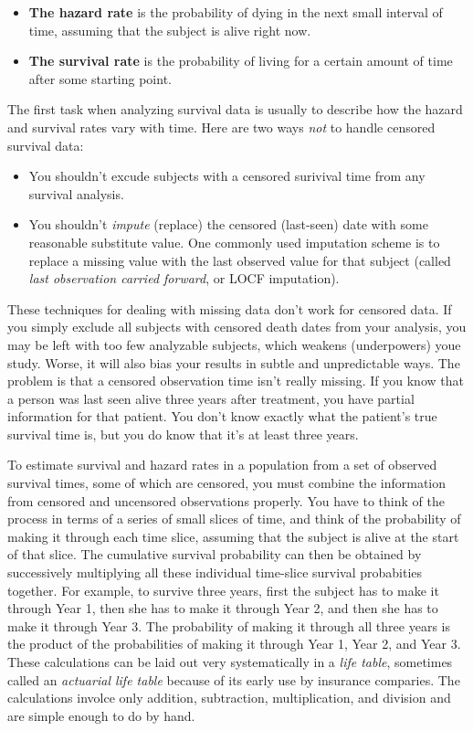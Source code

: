 \documentclass[a4paper,11pt]{article}
\begin{document}
\begin{itemize}[noitemsep]
\item \textbf{The hazard rate} is the probability of dying in the next small interval of time, assuming that the subject is alive right now.
\item \textbf{The survival rate} is the probability of living for a certain amount of time after some starting point.
\end{itemize}



The first task when analyzing survival data is usually to describe how the hazard and survival rates vary with time. 
Here are two ways \textit{not} to handle censored survival data:

\begin{itemize}[noitemsep]
\item You shouldn't excude subjects with a censored surivival time from any survival analysis.
\item You shouldn't \textit{impute} (replace) the censored (last-seen) date with some reasonable substitute value. One commonly used imputation scheme is to replace a missing value with the last observed value for that subject (called \textit{last observation carried forward}, or LOCF imputation). 
\end{itemize}

These techniques for dealing with missing data don't work for censored data. If you simply exclude all subjects with censored death dates from your analysis, you may be left with too few analyzable subjects, which weakens (underpowers) youe study. Worse, it will also bias your results in subtle and unpredictable ways. The problem is that a censored observation time isn't really missing. If you know that a person was last seen alive three years after treatment, you have partial information for that patient. You don't know exactly what the patient's true survival time is, but you do know that it's at least three years. 

To estimate survival and hazard rates in a population from a set of observed survival times, some of which are censored, you must combine the information from censored and uncensored observations properly. You have to think of the process in terms of a series of small slices of time, and think of the probability of making it through each time slice, assuming that the subject is alive at the start of that slice. The cumulative survival probability can then be obtained by successively multiplying all these individual time-slice survival probabities together. For example, to survive three years, first the subject has to make it through Year 1, then she has to make it through Year 2, and then she has to make it through Year 3. The probability of making it through all three years is the product of the probabilities of making it through Year 1, Year 2, and Year 3. These calculations can be laid out very systematically in a \textit{life table}, sometimes called an \textit{actuarial life table} because of its early use by  insurance comparies. The calculations involce only addition, subtraction, multiplication, and division and are simple enough to do by hand.
\end{document}
